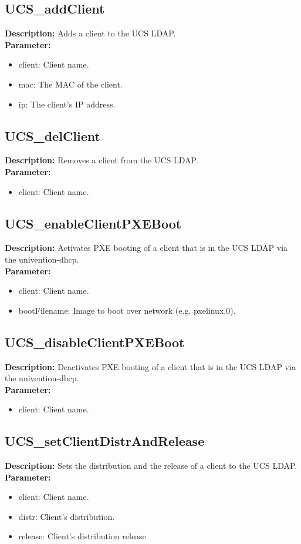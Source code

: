 \subsection{UCS\_addClient}
\textbf{Description:} Adds a client to the UCS LDAP.\\
\textbf{Parameter:}
\begin{itemize}
\item client: Client name.
\item mac: The MAC of the client.
\item ip: The client's IP address.
\end{itemize}

\subsection{UCS\_delClient}
\textbf{Description:} Removes a client from the UCS LDAP.\\
\textbf{Parameter:}
\begin{itemize}
\item client: Client name.
\end{itemize}

\subsection{UCS\_enableClientPXEBoot}
\textbf{Description:} Activates PXE booting of a client that is in the UCS LDAP via the univention-dhcp.\\
\textbf{Parameter:}
\begin{itemize}
\item client: Client name.
\item bootFilename: Image to boot over network (e.g. pxelinux.0).
\end{itemize}

\subsection{UCS\_disableClientPXEBoot}
\textbf{Description:} Deactivates PXE booting of a client that is in the UCS LDAP via the univention-dhcp.\\
\textbf{Parameter:}
\begin{itemize}
\item client: Client name.
\end{itemize}

\subsection{UCS\_setClientDistrAndRelease}
\textbf{Description:} Sets the distribution and the release of a client to the UCS LDAP.\\
\textbf{Parameter:}
\begin{itemize}
\item client: Client name.
\item distr: Client's distribution.
\item release: Client's distribution release.
\end{itemize}

